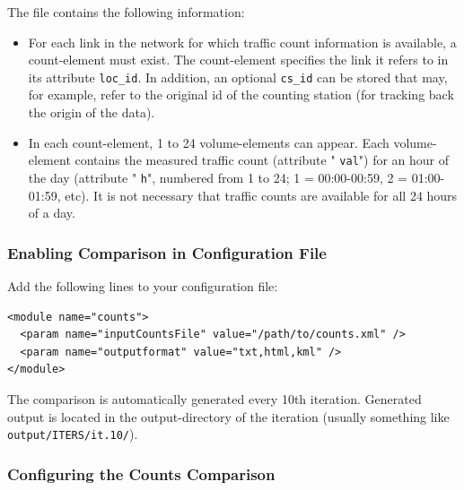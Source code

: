 The file contains the following information:
\begin{itemize}
	\item For each link in the network for which traffic count information  is available, a count-element must exist. The count-element specifies  the link it refers to in its attribute 
\texttt{loc\_id}. In addition, an optional 
\texttt{cs\_id}  can be stored that may, for example, refer to the original id of the  counting station (for tracking back the origin of the data).
	\item In each count-element, 1 to 24 volume-elements can appear. Each volume-element contains the measured traffic count (attribute "
\texttt{val}") for an hour of the day (attribute "
\texttt{h}",  numbered from 1 to 24; 1 = 00:00-00:59, 2 = 01:00-01:59, etc). It is  not necessary that traffic counts are available for all 24 hours of a  day.
\end{itemize}


\subsubsection{Enabling Comparison in Configuration File}

Add the following lines to your configuration file:
\begin{verbatim}
<module name="counts">
  <param name="inputCountsFile" value="/path/to/counts.xml" />
  <param name="outputformat" value="txt,html,kml" />
</module>

\end{verbatim}

The comparison is automatically generated every 10th iteration.  Generated output is located in the output-directory of the iteration  (usually something like
\texttt{output/ITERS/it.10/}).


\subsubsection{Configuring the Counts Comparison}

